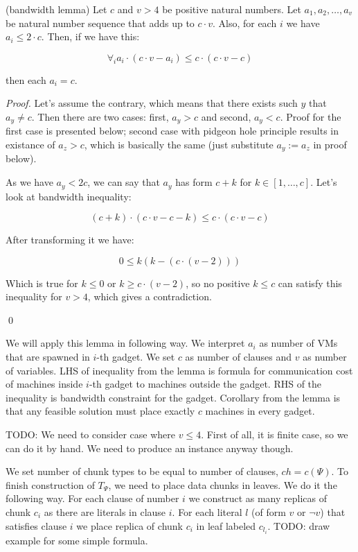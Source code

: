\begin{lemma} (bandwidth lemma)
Let $c$ and $v > 4$ be positive natural numbers. Let $a_1, a_2, \ldots,
a_v$ be natural number sequence that adds up to $c \cdot v$. Also, for
each $i$ we have $a_i \leq 2 \cdot c$. Then, if we have this:

$$ \forall_i a_i \cdot (c \cdot v - a_i) \leq c \cdot (c \cdot v -
c) $$

then each $a_i = c$.
\end{lemma}
\begin{proof}

Let's assume the contrary, which means that there exists such $y$ that
$a_y \neq c$. Then there are two cases: first, $a_y>c$ and second,
$a_y<c$. Proof for the first case is presented below; second case
with pidgeon hole principle results in existance of $a_z > c$, which
is basically the same (just substitute $a_y := a_z$ in proof below).

As we have $a_y < 2c$, we can say that $a_y$ has form $c +
k$ for $k \in [1, \ldots, c]$. Let's look at bandwidth inequality:

$$ (c + k) \cdot (c \cdot v - c - k) \leq c \cdot (c \cdot v - c) $$

After transforming it we have:

$$ 0 \leq k(k - (c \cdot (v - 2))) $$

Which is true for $k \leq 0$ or $k \geq c \cdot (v - 2)$, so no
positive $k \leq c$ can satisfy this inequality for $v > 4$, which gives a contradiction. 

\qed

\end{proof}

We will apply this lemma in following way. We interpret $a_i$ as
number of VMs that are spawned in $i$-th gadget. We set $c$ as number
of clauses and $v$ as number of variables. LHS of inequality from the
lemma is formula for communication cost of machines inside $i$-th
gadget to machines outside the gadget. RHS of the inequality is
bandwidth constraint for the gadget. Corollary from the lemma is that
any feasible solution must place exactly $c$ machines in every gadget.

TODO: We need to consider case where $v \leq 4$. First of all, it is
finite case, so we can do it by hand. We need to
produce an instance anyway though.

We set number of chunk types to be equal to number of clauses, $ch =
c(\Psi)$. To finish construction of $T_{\Psi}$, we need to place data chunks in
leaves. We do it the following way. For each clause of number $i$ we
construct as many replicas of chunk $c_i$ as there are literals in
clause $i$. For each literal $l$ (of form $v$ or $\neg v$) that satisfies clause $i$ we place
replica of chunk $c_i$ in leaf labeled $c_{l_i}$. TODO: draw example for
some simple formula.

